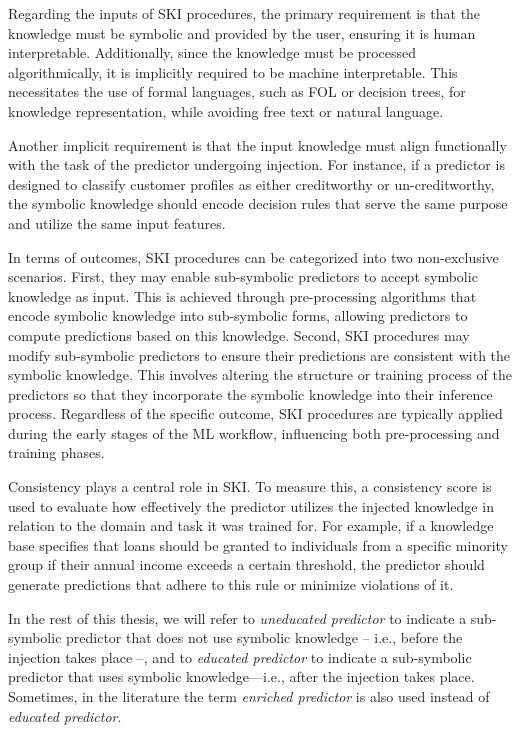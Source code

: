 Regarding the inputs of \gls{SKI} procedures, the primary requirement is that the knowledge must be symbolic and provided by the user, ensuring it is human interpretable.
%
Additionally, since the knowledge must be processed algorithmically, it is implicitly required to be machine interpretable.
%
This necessitates the use of formal languages, such as \gls{FOL} or decision trees, for knowledge representation, while avoiding free text or natural language.

Another implicit requirement is that the input knowledge must align functionally with the task of the predictor undergoing injection.
%
For instance, if a predictor is designed to classify customer profiles as either creditworthy or un-creditworthy, the symbolic knowledge should encode decision rules that serve the same purpose and utilize the same input features.

In terms of outcomes, \gls{SKI} procedures can be categorized into two non-exclusive scenarios.
%
First, they may enable sub-symbolic predictors to accept symbolic knowledge as input.
%
This is achieved through pre-processing algorithms that encode symbolic knowledge into sub-symbolic forms, allowing predictors to compute predictions based on this knowledge.
%
Second, \gls{SKI} procedures may modify sub-symbolic predictors to ensure their predictions are consistent with the symbolic knowledge.
%
This involves altering the structure or training process of the predictors so that they incorporate the symbolic knowledge into their inference process.
%
Regardless of the specific outcome, \gls{SKI} procedures are typically applied during the early stages of the \gls{ML} workflow, influencing both pre-processing and training phases.

Consistency plays a central role in \gls{SKI}.
%
To measure this, a consistency score is used to evaluate how effectively the predictor utilizes the injected knowledge in relation to the domain and task it was trained for.
%
For example, if a knowledge base specifies that loans should be granted to individuals from a specific minority group if their annual income exceeds a certain threshold, the predictor should generate predictions that adhere to this rule or minimize violations of it.

In the rest of this thesis, we will refer to \emph{uneducated predictor} to indicate a sub-symbolic predictor that does not use symbolic knowledge -- i.e., before the injection takes place --, and to \emph{educated predictor} to indicate a sub-symbolic predictor that uses symbolic knowledge---i.e., after the injection takes place.
%
Sometimes, in the literature the term \emph{enriched predictor} is also used instead of \emph{educated predictor}.


